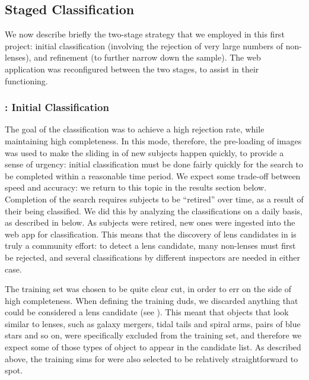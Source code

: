 \documentclass[useAMS,usenatbib,a4paper]{mn2e}
\begin{document}
\subsection{Staged Classification}
\label{sec:design:stages}

We now describe briefly the two-stage strategy that we employed in this first
project: initial classification (involving the rejection of very large numbers
of non-lenses), and refinement (to further narrow down the sample). The web
application was reconfigured between the two stages, to assist in their
functioning.

\subsubsection{\StageOne: Initial Classification}

The goal of the \StageOne classification was to achieve a high rejection rate,
while maintaining high completeness.  In this mode, therefore, the pre-loading
of images was used to make the sliding in of new subjects happen quickly, to
provide a sense of urgency: initial classification must be done fairly
quickly for the search to be completed within a reasonable time period.  We
expect some trade-off between speed and accuracy: we return to this topic in the
results section below. Completion of the search requires subjects to be
``retired'' over time, as a result of their being classified. We did this by
analyzing the classifications on a daily basis, as described in
 below. As subjects were retired, new ones were ingested into
the web app for classification. This means that the discovery of lens
candidates in \StageOne is truly a community effort: to detect a lens candidate,
many non-lenses must first be rejected, and several classifications by
different inspectors are needed in either case.

The \StageOne training set was chosen to be quite clear cut, in order to err on
the side of high completeness. When defining the
training duds, we discarded anything that could be considered a lens candidate
(see ). This meant that objects that look
similar to lenses, such as galaxy mergers, tidal tails and spiral arms, pairs of
blue stars and so on, were specifically excluded from the training set, and
therefore we expect some of those types of object to appear in the \StageOne
candidate list. As described above, the training sims for \StageOne were also
selected to be relatively straightforward to spot.
\end{document}
